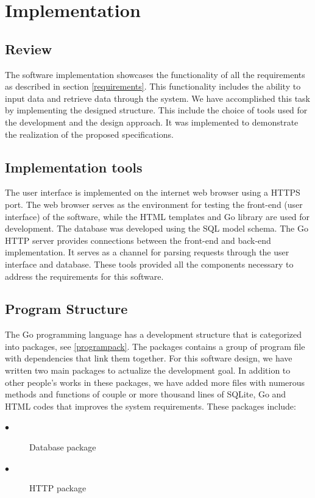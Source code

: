 \chapter{Implementation}
\label{chap:ch4_abbr}
\label{chap:figtab}
\section{Review}
The software implementation showcases the functionality of all the requirements as described in section \ref{requirements}. This functionality includes the ability to input data and retrieve data through the system. We have accomplished this task by implementing the designed structure. This include the choice of tools used for the development and the design approach. It was implemented to demonstrate the realization of the proposed specifications.
\section{Implementation tools}
The user interface is implemented on the internet web browser using a HTTPS port. The web browser serves as the environment for testing the front-end (user interface) of the software, while the HTML templates and Go library are used for development. The database was developed using the SQL model schema. The Go HTTP server provides connections between the front-end and back-end implementation. It serves as a channel for parsing requests through the user interface and database. These tools provided all the components necessary to address the requirements for this software. 
\section{Program Structure} \label{Programstructure}
The Go programming language has a development structure that is categorized into packages, see \autoref{programpack}. The packages contains a group of program file with dependencies that link them together. For this software design, we have written two main packages to actualize the development goal. In addition to other people's works in these packages, we have added more files with numerous methods and functions of couple or more thousand lines of SQLite, Go and HTML codes that improves the system requirements. These packages include:
\begin{description}
\item[$\bullet$]Database package 
\item[$\bullet$]HTTP package 
\end{description}

